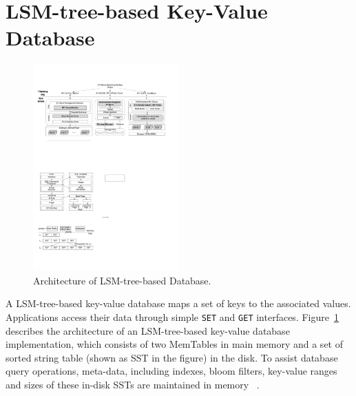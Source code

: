 \section{LSM-tree-based Key-Value Database}
\begin{figure}[h]
	\centering
	\includegraphics[width=0.5\textwidth]{pic/LSM-TREE.pdf}
	\caption{Architecture of LSM-tree-based Database.}
	\label{fig:LSM-TREE}
	\centering
\end{figure}
A LSM-tree-based key-value database maps a set of keys to the associated values. Applications access their data through simple {\tt SET} and {\tt GET} interfaces.
Figure~\ref{fig:LSM-TREE} describes the architecture of an LSM-tree-based key-value database implementation, which consists of two MemTables in main memory and a set of sorted string table (shown as SST in the figure) in the disk. To assist database query operations, meta-data, including indexes, bloom filters, key-value ranges and sizes of these in-disk SSTs are maintained in memory ~\cite{sears2012blsm}.

